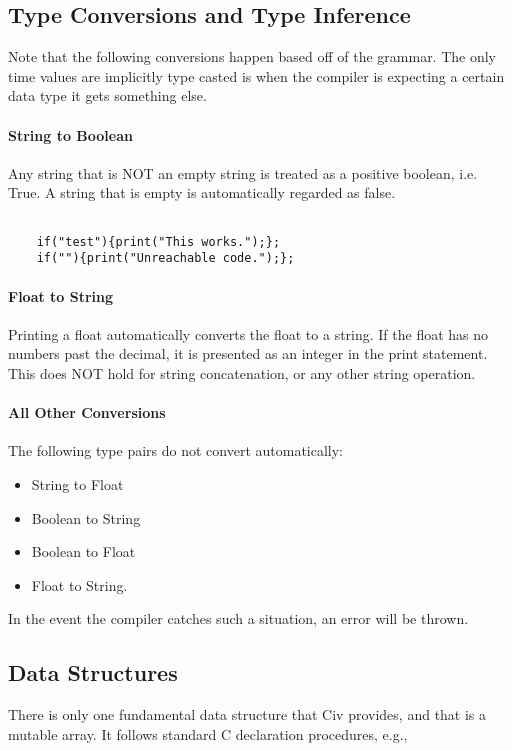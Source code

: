 \documentclass[a4paper]{article}
\begin{document}
\subsection{Type Conversions and Type Inference}
Note that the following conversions happen based off of the grammar. The only time values are implicitly type casted is when the compiler is expecting a certain data type it gets something else.

\paragraph{String to Boolean}
Any string that is NOT an empty string is treated as a positive boolean, i.e. True. A string that is empty is automatically regarded as false.

{\selectfont
\begin{lstlisting}

	if("test"){print("This works.");};
	if(""){print("Unreachable code.");};
\end{lstlisting}
}

\paragraph{Float to String}
Printing a float automatically converts the float to a string. If the float has no numbers past the decimal, it is presented as an integer in the print statement. This does NOT hold for string concatenation, or any other string operation.

\paragraph{All Other Conversions}
The following type pairs do not convert automatically:
\begin{itemize}
\item{String to Float}
\item{Boolean to String}
\item{Boolean to Float}
\item{Float to String}.
\end{itemize}
In the event the compiler catches such a situation, an error will be thrown.

\subsection{Data Structures}
There is only one fundamental data structure that Civ provides, and that is a mutable array. It follows standard C declaration procedures, e.g.,
\end{document}
